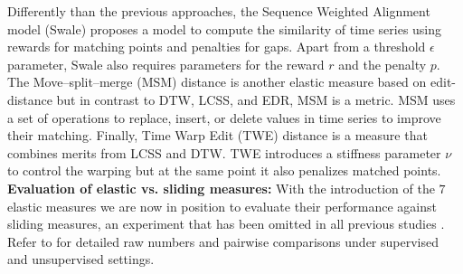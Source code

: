 \documentclass[11pt]{article}
\begin{document}
Differently than the previous approaches, the Sequence Weighted Alignment model (Swale) \cite{morse2007efficient} proposes a model to compute the similarity of time series using rewards for matching points and penalties for gaps. Apart from a threshold $\epsilon$ parameter, Swale also requires parameters for the reward $r$ and the penalty $p$. The Move–split–merge (MSM) distance \cite{stefan2013move} is another elastic measure based on edit-distance but in contrast to DTW, LCSS, and EDR, MSM is a metric. MSM uses a set of operations to replace, insert, or delete values in time series to improve their matching. Finally, Time Warp Edit (TWE) distance \cite{marteau2008time} is a measure that combines merits from LCSS and DTW. TWE introduces a stiffness parameter $\nu$ to control the warping but at the same point it also penalizes matched points.
\newline \textbf{Evaluation of elastic vs. sliding measures: } With the introduction of the $7$ elastic measures we are now in position to evaluate their performance against sliding measures, an experiment that has been omitted in all previous studies \cite{ding2008querying,bagnall2017great}. Refer to \cite{paparrizos2020debunking} for detailed raw numbers and pairwise comparisons under supervised and unsupervised settings.
\end{document}
